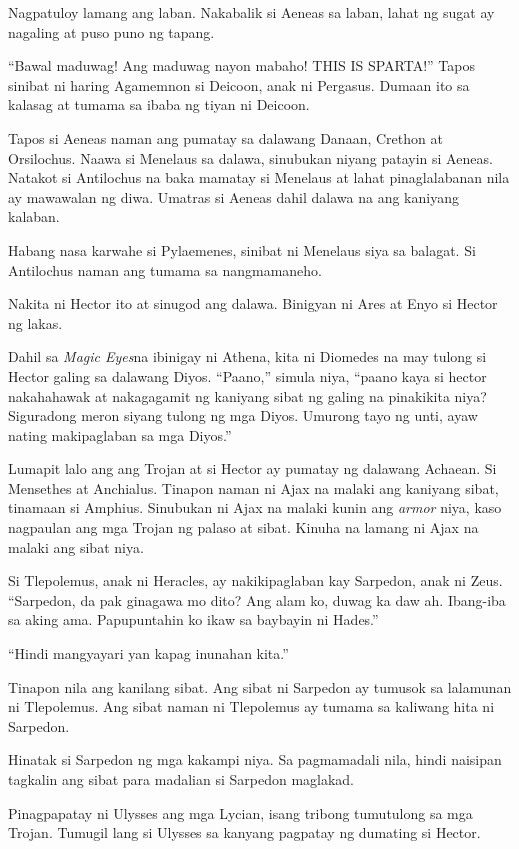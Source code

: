 \documentclass[12pt,letterpaper]{report}
\begin{document}
Nagpatuloy lamang ang laban. Nakabalik si Aeneas sa laban, lahat ng sugat ay nagaling at puso puno ng tapang.

``Bawal maduwag! Ang maduwag nayon mabaho! THIS IS SPARTA!'' Tapos sinibat ni haring Agamemnon si Deicoon, anak ni Pergasus. Dumaan ito sa kalasag at tumama sa ibaba ng tiyan ni Deicoon.

Tapos si Aeneas naman ang pumatay sa dalawang Danaan, Crethon at Orsilochus. Naawa si Menelaus sa dalawa, sinubukan niyang patayin si Aeneas. Natakot si Antilochus na baka mamatay si Menelaus at lahat pinaglalabanan nila ay mawawalan ng diwa. Umatras si Aeneas dahil dalawa na ang kaniyang kalaban.

Habang nasa karwahe si Pylaemenes, sinibat ni Menelaus siya sa balagat. Si Antilochus naman ang tumama sa nangmamaneho.

Nakita ni Hector ito at sinugod ang dalawa. Binigyan ni Ares at Enyo si Hector ng lakas.

Dahil sa \textit{Magic Eyes}\texttrademark na ibinigay ni Athena, kita ni Diomedes na may tulong si Hector galing sa dalawang Diyos. ``Paano,'' simula niya, ``paano kaya si hector nakahahawak at nakagagamit ng kaniyang sibat ng galing na pinakikita niya? Siguradong meron siyang tulong ng mga Diyos. Umurong tayo ng unti, ayaw nating makipaglaban sa mga Diyos.''

Lumapit lalo ang ang Trojan at si Hector ay pumatay ng dalawang Achaean. Si Mensethes at Anchialus. Tinapon naman ni Ajax na malaki ang kaniyang sibat, tinamaan si Amphius. Sinubukan ni Ajax na malaki kunin ang \textit{armor} niya, kaso nagpaulan ang mga Trojan ng palaso at sibat. Kinuha na lamang ni Ajax na malaki ang sibat niya.

Si Tlepolemus, anak ni Heracles, ay nakikipaglaban kay Sarpedon, anak ni Zeus. ``Sarpedon, da pak ginagawa mo dito? Ang alam ko, duwag ka daw ah. Ibang-iba sa aking ama. Papupuntahin ko ikaw sa baybayin ni Hades.''

``Hindi mangyayari yan kapag inunahan kita.''

Tinapon nila ang kanilang sibat. Ang sibat ni Sarpedon ay tumusok sa lalamunan ni Tlepolemus. Ang sibat naman ni Tlepolemus ay tumama sa kaliwang hita ni Sarpedon.

Hinatak si Sarpedon ng mga kakampi niya. Sa pagmamadali nila, hindi naisipan tagkalin ang sibat para madalian si Sarpedon maglakad.

Pinagpapatay ni Ulysses ang mga Lycian, isang tribong tumutulong sa mga Trojan. Tumugil lang si Ulysses sa kanyang pagpatay ng dumating si Hector.
\end{document}
